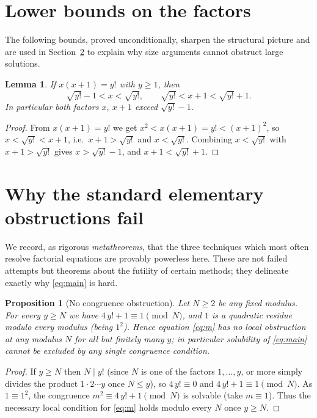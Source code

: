 \documentclass{amsart}
\theoremstyle{plain}
\newtheorem{proposition}{Proposition}
\newtheorem{lemma}{Lemma}
\theoremstyle{remark}
\begin{document}
\section{Lower bounds on the factors}\label{sec:bounds}

The following bounds, proved unconditionally, sharpen the structural picture
and are used in Section~\ref{sec:obstruction} to explain why size arguments
cannot obstruct large solutions.

\begin{lemma}\label{lem:size}
If $x(x+1)=y!$ with $y\ge1$, then
\[
   \sqrt{y!}-1<x<\sqrt{y!},\qquad \sqrt{y!}<x+1<\sqrt{y!}+1 .
\]
In particular both factors $x,\ x+1$ exceed $\sqrt{y!}-1$.
\end{lemma}

\begin{proof}
From $x(x+1)=y!$ we get $x^2<x(x+1)=y!<(x+1)^2$, so $x<\sqrt{y!}<x+1$, i.e.\
$x+1>\sqrt{y!}$ and $x<\sqrt{y!}$. Combining $x<\sqrt{y!}$ with
$x+1>\sqrt{y!}$ gives $x>\sqrt{y!}-1$, and $x+1<\sqrt{y!}+1$.
\end{proof}

\section{Why the standard elementary obstructions fail}\label{sec:obstruction}

We record, as rigorous \emph{metatheorems}, that the three techniques which
most often resolve factorial equations are provably powerless here.  These
are not failed attempts but theorems about the futility of certain methods;
they delineate exactly why \eqref{eq:main} is hard.

\begin{proposition}[No congruence obstruction]\label{prop:nocong}
Let $N\ge2$ be any fixed modulus. For every $y\ge N$ we have
$4\,y!+1\equiv1\pmod N$, and $1$ is a quadratic residue modulo every modulus
(being $1^2$). Hence equation \eqref{eq:m} has \emph{no} local obstruction at
any modulus $N$ for all but finitely many $y$; in particular solubility of
\eqref{eq:main} cannot be excluded by any single congruence condition.
\end{proposition}

\begin{proof}
If $y\ge N$ then $N\mid y!$ (since $N$ is one of the factors $1,\dots,y$, or
more simply divides the product $1\cdot2\cdots y$ once $N\le y$), so
$4\,y!\equiv0$ and $4\,y!+1\equiv1\pmod N$. As $1\equiv1^2$, the congruence
$m^2\equiv4\,y!+1\pmod N$ is solvable (take $m\equiv1$). Thus the necessary
local condition for \eqref{eq:m} holds modulo every $N$ once $y\ge N$.
\end{proof}
\end{document}
